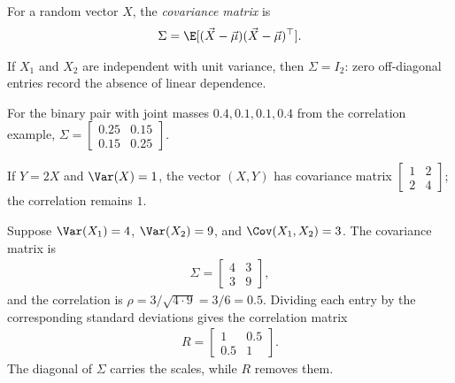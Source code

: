 \documentclass[a4paper, 12pt]{book}
\begin{document}
\begin{definition}
    For a random vector $X$, the \emph{covariance matrix} is
\begin{align}
    \Sigma = \E[(\vec{X}-\vec{\mu})(\vec{X}-\vec{\mu})^\top].
\end{align}
\end{definition}
\begin{example}
    If $X_1$ and $X_2$ are independent with unit variance, then $\Sigma=I_2$: zero off-diagonal entries record the absence of linear dependence.
\end{example}

\begin{example}
    For the binary pair with joint masses $0.4,0.1,0.1,0.4$ from the correlation example, $\Sigma=\begin{bmatrix}0.25&0.15\\0.15&0.25\end{bmatrix}$.
\end{example}

\begin{example}
    If $Y=2X$ and $\Var(X)=1$, the vector $(X,Y)$ has covariance matrix $\begin{bmatrix}1&2\\2&4\end{bmatrix}$; the correlation remains $1$.
\end{example}

\begin{example}
    Suppose $\Var(X_1)=4$, $\Var(X_2)=9$, and $\Cov(X_1,X_2)=3$. The covariance
    matrix is
    \begin{align}
        \Sigma =
        \begin{bmatrix}4&3\\3&9\end{bmatrix},
    \end{align}
    and the correlation is $\rho=3/\sqrt{4\cdot9}=3/6=0.5$. Dividing each entry
    by the corresponding standard deviations gives the correlation matrix
    \begin{align}
        R =
        \begin{bmatrix}1&0.5\\0.5&1\end{bmatrix}.
    \end{align}
    The diagonal of $\Sigma$ carries the scales, while $R$
    removes them.
\end{example}
\end{document}
